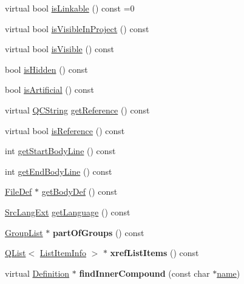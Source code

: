 \begin{DoxyCompactItemize}
\item 
virtual bool \hyperlink{class_definition_a53420387530937059d408a7e4316c375}{is\-Linkable} () const =0
\item 
virtual bool \hyperlink{class_definition_afadf7236b478e199e25cd5cc6f4b5ce4}{is\-Visible\-In\-Project} () const 
\item 
virtual bool \hyperlink{class_definition_a08422ee75ab02691943c1ca87e2bc563}{is\-Visible} () const 
\item 
bool \hyperlink{class_definition_a4968ab065e464b725f9e01fdc4f1c607}{is\-Hidden} () const 
\item 
bool \hyperlink{class_definition_a06a975cbab8499f41525eb70f95815b8}{is\-Artificial} () const 
\item 
virtual \hyperlink{class_q_c_string}{Q\-C\-String} \hyperlink{class_definition_a87b81ea7f17740033bf8fb12f796c494}{get\-Reference} () const 
\item 
virtual bool \hyperlink{class_definition_ab7dc8cc872f3cec2e07dace4293989aa}{is\-Reference} () const 
\item 
int \hyperlink{class_definition_a2710939b1b9101f428f203f6de224dbc}{get\-Start\-Body\-Line} () const 
\item 
int \hyperlink{class_definition_a8f5b9cecf6b3c7fc528fe1b5fcda0843}{get\-End\-Body\-Line} () const 
\item 
\hyperlink{class_file_def}{File\-Def} $\ast$ \hyperlink{class_definition_a1f41ecc8895188e421173ae7c095c43d}{get\-Body\-Def} () const 
\item 
\hyperlink{types_8h_a9974623ce72fc23df5d64426b9178bf2}{Src\-Lang\-Ext} \hyperlink{class_definition_a31277e4ef87d16d309b3fc5cece4ae65}{get\-Language} () const 
\item 
\hypertarget{class_definition_a73f68d6e0aaf6dcd34488958847e17db}{\hyperlink{class_group_list}{Group\-List} $\ast$ {\bfseries part\-Of\-Groups} () const }\label{class_definition_a73f68d6e0aaf6dcd34488958847e17db}

\item 
\hypertarget{class_definition_a0e27debbb81eb41c3346e4302f04e4c4}{\hyperlink{class_q_list}{Q\-List}$<$ \hyperlink{struct_list_item_info}{List\-Item\-Info} $>$ $\ast$ {\bfseries xref\-List\-Items} () const }\label{class_definition_a0e27debbb81eb41c3346e4302f04e4c4}

\item 
\hypertarget{class_definition_a5f4c10da520e9553c62483027168c42c}{virtual \hyperlink{class_definition}{Definition} $\ast$ {\bfseries find\-Inner\-Compound} (const char $\ast$\hyperlink{class_definition_a2c310e06c9aadc6fb218f80fcbb5c695}{name})}\label{class_definition_a5f4c10da520e9553c62483027168c42c}


\end{DoxyCompactItemize}
